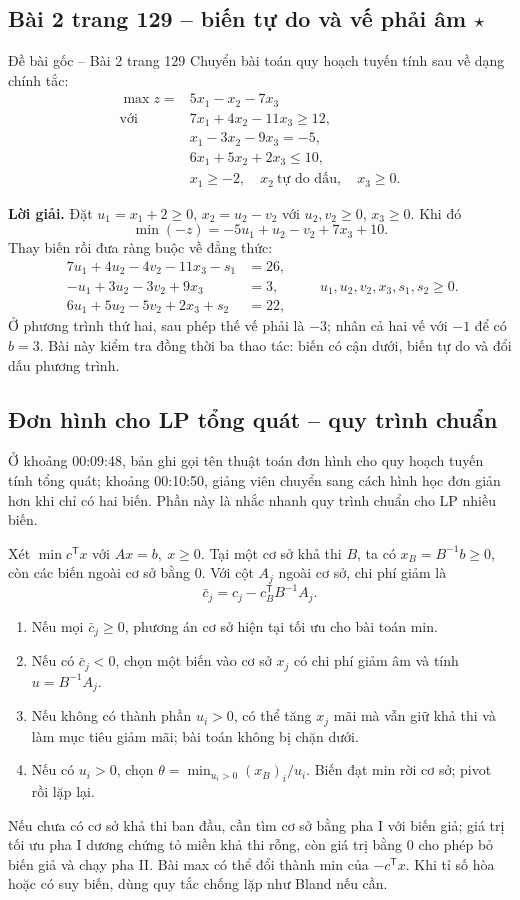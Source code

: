 \documentclass[11pt,a4paper]{article}
\newcommand{\T}{^{\mathsf T}}
\begin{document}
\subsection{Bài 2 trang 129 -- biến tự do và vế phải âm \(\star\)}
\begin{questionbox}{Đề bài gốc -- Bài 2 trang 129}
Chuyển bài toán quy hoạch tuyến tính sau về dạng chính tắc:
\[
\begin{aligned}
\max z={}&5x_1-x_2-7x_3\\
\text{với }&
7x_1+4x_2-11x_3\ge12,\\
&x_1-3x_2-9x_3=-5,\\
&6x_1+5x_2+2x_3\le10,\\
&x_1\ge-2,\quad x_2\ \text{tự do dấu},\quad x_3\ge0.
\end{aligned}
\]
\end{questionbox}
\textbf{Lời giải.}
Đặt \(u_1=x_1+2\ge0\), \(x_2=u_2-v_2\) với \(u_2,v_2\ge0\), \(x_3\ge0\). Khi đó
\[
\min(-z)=-5u_1+u_2-v_2+7x_3+10.
\]
Thay biến rồi đưa ràng buộc về đẳng thức:
\[
\begin{aligned}
7u_1+4u_2-4v_2-11x_3-s_1&=26,\\
-u_1+3u_2-3v_2+9x_3&=3,\\
6u_1+5u_2-5v_2+2x_3+s_2&=22,
\end{aligned}
\qquad
u_1,u_2,v_2,x_3,s_1,s_2\ge0.
\]
Ở phương trình thứ hai, sau phép thế vế phải là \(-3\); nhân cả hai vế với \(-1\) để có \(b=3\). Bài này kiểm tra đồng thời ba thao tác: biến có cận dưới, biến tự do và đổi dấu phương trình.

\subsection{Đơn hình cho LP tổng quát -- quy trình chuẩn}
Ở khoảng 00:09:48, bản ghi gọi tên thuật toán đơn hình cho quy hoạch tuyến tính tổng quát; khoảng 00:10:50, giảng viên chuyển sang cách hình học đơn giản hơn khi chỉ có hai biến. Phần này là nhắc nhanh quy trình chuẩn cho LP nhiều biến.

Xét \(\min c\T x\) với \(Ax=b,\ x\ge0\). Tại một cơ sở khả thi \(B\), ta có \(x_B=B^{-1}b\ge0\), còn các biến ngoài cơ sở bằng \(0\). Với cột \(A_j\) ngoài cơ sở, chi phí giảm là
\[
\bar c_j=c_j-c_B\T B^{-1}A_j.
\]
\begin{enumerate}
\item Nếu mọi \(\bar c_j\ge0\), phương án cơ sở hiện tại tối ưu cho bài toán min.
\item Nếu có \(\bar c_j<0\), chọn một biến vào cơ sở \(x_j\) có chi phí giảm âm và tính \(u=B^{-1}A_j\).
\item Nếu không có thành phần \(u_i>0\), có thể tăng \(x_j\) mãi mà vẫn giữ khả thi và làm mục tiêu giảm mãi; bài toán không bị chặn dưới.
\item Nếu có \(u_i>0\), chọn \(\theta=\min_{u_i>0}(x_B)_i/u_i\). Biến đạt min rời cơ sở; pivot rồi lặp lại.
\end{enumerate}
Nếu chưa có cơ sở khả thi ban đầu, cần tìm cơ sở bằng pha I với biến giả; giá trị tối ưu pha I dương chứng tỏ miền khả thi rỗng, còn giá trị bằng \(0\) cho phép bỏ biến giả và chạy pha II. Bài max có thể đổi thành min của \(-c\T x\). Khi tỉ số hòa hoặc có suy biến, dùng quy tắc chống lặp như Bland nếu cần.
\end{document}
